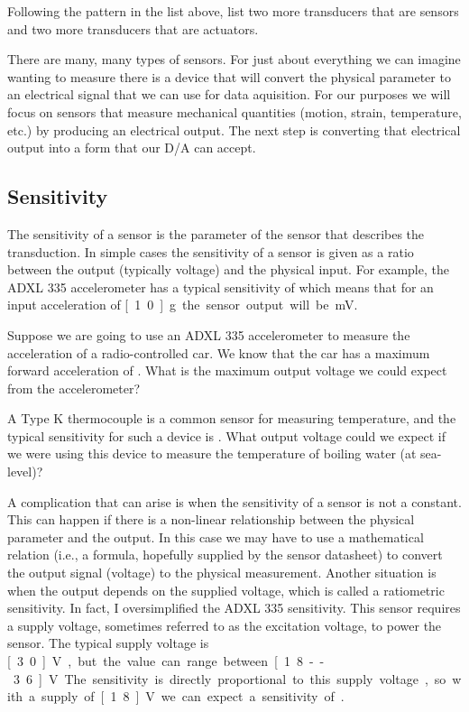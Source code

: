 \begin{ex}
Following the pattern in the list above, list two more transducers that are sensors and two more transducers that are actuators.
\end{ex}

There are many, many types of sensors.  For just about everything we can imagine wanting to measure there is a device that will convert the physical parameter to an electrical signal that we can use for data aquisition.  For our purposes we will focus on sensors that measure mechanical quantities (motion, strain, temperature, etc.) by producing an electrical output.  The next step is converting that electrical output into a form that our D/A can accept.  

\subsection{Sensitivity}
The sensitivity of a sensor is the parameter of the sensor that describes the transduction.  In simple cases the sensitivity of a sensor is given as a ratio between the output (typically voltage) and the physical input.  For example, the ADXL 335 accelerometer has a typical sensitivity of  which means that for an input acceleration of \unit[1.0]{g} the sensor output will be \unit[300]{mV}.
\begin{ex}\label{ex:asens}
Suppose we are going to use an ADXL 335 accelerometer to measure the acceleration of a radio-controlled car.  We know that the car has a maximum forward acceleration of .  What is the maximum output voltage we could expect from the accelerometer?
\end{ex}
\begin{ex}
A Type K thermocouple is a common sensor for measuring temperature, and the typical sensitivity for such a device is .  What output voltage could we expect if we were using this device to measure the temperature of boiling water (at sea-level)?
\end{ex}

A complication that can arise is when the sensitivity of a sensor is not a constant.  This can happen if there is a non-linear relationship between the physical parameter and the output.  In this case we may have to use a mathematical relation (i.e., a formula, hopefully supplied by the sensor datasheet) to convert the output signal (voltage) to the physical measurement.  Another situation is when the output depends on the supplied voltage, which is called a \gls{ratiometric} sensitivity.  In fact, I oversimplified the ADXL 335 sensitivity.  This sensor requires a supply voltage, sometimes referred to as the \gls{excitation voltage}, to power the sensor.  The typical supply voltage is \unit[3.0]{V}, but the value can range between \unit[1.8--3.6]{V}.  The sensitivity is directly proportional to this supply voltage, so with a supply of \unit[1.8]{V} we can expect a sensitivity of .  


